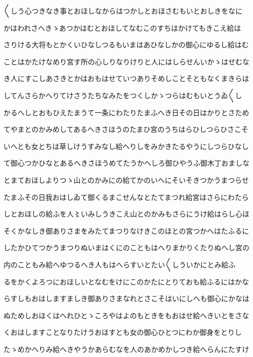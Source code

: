 \documentclass[a4paper,11pt,landscape]{ltjtarticle}
\begin{document}
\par\medskip
〱しう心つきなき事とおほしなからはつかしとおほさむもいとおしきをなに
\par\medskip
かはわれさへきゝあつかはむとおほしてなむこのすちはかけてもきこえ給は
\par\medskip
さりける大将もとかくいひなしつるもいまはあひなしかの御心にゆるし給はむ
\par\medskip
ことはかたけなめり宮す所の心しりなりけりと人にはしらせんいかゝはせむな
\par\medskip
き人にすこしあさきとかはおもはせていつありそめしことそともなくまきらは
\par\medskip
してんさらかへりてけさうたちなみたをつくしかゝつらはむもいとうゐ〱し
\par\medskip
かるへしとおもひえたまうて一条にわたりたまふへき日その日はかりとさため
\par\medskip
てやまとのかみめしてあるへきさほうのたまひ宮のうちはらひしつらひさこそ
\par\medskip
いへとも女とちは草しけうすみなし給へりしをみかきたるやうにしつらひなし
\par\medskip
て御心つかひなとあるへきさほうめてたうかへしろ御ひやうふ御木丁おましな
\par\medskip
とまておほしよりつゝ山とのかみにの給てかのいへにそいそきつかうまつらせ
\par\medskip
たまふその日我おはしゐて御くるまこせんなとたてまつれ給宮はさらにわたら
\par\medskip
しとおほしの給ふを人〻いみしうきこえ山とのかみもさらにうけ給はらし心ほ
\par\medskip
そくかなしき御ありさまをみたてまつりなけきこのほとの宮つかへはたふるに
\par\medskip
したかひてつかうまつりぬいまはくにのこともはへりまかりくたりぬへし宮の
\par\medskip
内のこともみ給へゆつるへき人もはへらすいとたい〱しういかにとみ給ふ
\par\medskip
るをかくよろつにおほしいとなむをけにこのかたにとりておも給ふるにはかな
\par\medskip
らすしもおはしますましき御ありさまなれとさこそはいにしへも御心にかなは
\par\medskip
ぬためしおほくはへれひとゝころやはよのもときをもおはせ給へきいとをさな
\par\medskip
くおはしますことなりたけうおほすとも女の御心ひとつにわか御身をとりし
\par\medskip
たゝめかへりみ給へきやうかあらむなを人のあかめかしつき給へらんにたすけ
\par\medskip
\end{document}
